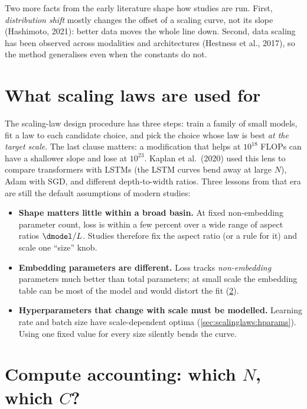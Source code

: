 Two more facts from the early literature shape how studies are run. First, \emph{distribution
shift} mostly changes the offset of a scaling curve, not its slope (Hashimoto, 2021): better data
moves the whole line down. Second, data scaling has been observed across modalities and
architectures (Hestness et al., 2017), so the method generalises even when the constants do not.

\section{What scaling laws are used for}\label{sec:scalinglaws:uses}

The scaling-law design procedure has three steps: train a family of small models, fit a law
to each candidate choice, and pick the choice whose law is best \emph{at the target scale}. The
last clause matters: a modification that helps at $10^{18}$ FLOPs can have a shallower slope and
lose at $10^{23}$. Kaplan et al.\ (2020) used this lens to compare transformers with LSTMs (the
LSTM curves bend away at large $N$), Adam with SGD, and different depth-to-width ratios. Three
lessons from that era are still the default assumptions of modern studies:
\begin{itemize}
  \item \textbf{Shape matters little within a broad basin.} At fixed non-embedding parameter
        count, loss is within a few percent over a wide range of aspect ratios $\dmodel/L$.
        Studies therefore fix the aspect ratio (or a rule for it) and scale one ``size'' knob.
  \item \textbf{Embedding parameters are different.} Loss tracks \emph{non-embedding}
        parameters much better than total parameters; at small scale the embedding table can be
        most of the model and would distort the fit (\cref{sec:scalinglaws:accounting}).
  \item \textbf{Hyperparameters that change with scale must be modelled.} Learning rate and
        batch size have scale-dependent optima (\cref{sec:scalinglaws:hparams}). Using one fixed
        value for every size silently bends the curve.
\end{itemize}

\section{Compute accounting: which $N$, which $C$?}\label{sec:scalinglaws:accounting}

